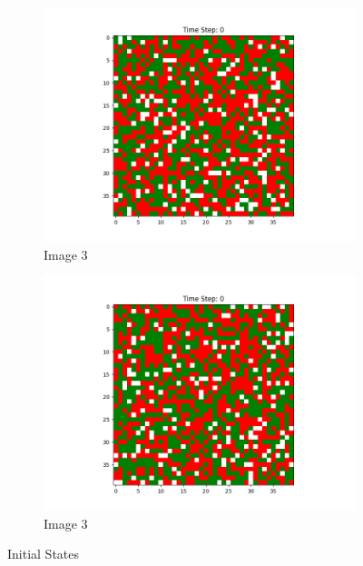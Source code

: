 \documentclass[12pt]{article}
\begin{document}
\begin{figure}[h]
\begin{subfigure}{0.2\textwidth}
			\includegraphics[width=\linewidth]{initial_social_n20p3.png}				\caption{Image 3}
		\end{subfigure}\hspace{0.02\textwidth}
		\begin{subfigure}{0.2\textwidth}
			\includegraphics[width=\linewidth]{initial_social_n20p5.png}
			\caption{Image 3}
		\end{subfigure}\hspace{0.02\textwidth}
	\caption{Initial States}
	\end{figure}
	
\end{document}
